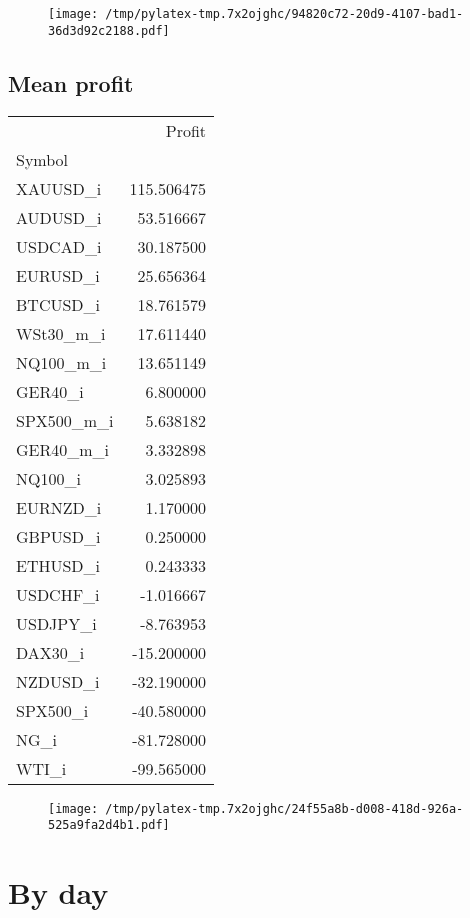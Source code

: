 \documentclass{article}%
\begin{document}
\begin{figure}[htbp]%
\centering%
\texttt{[image: /tmp/pylatex-tmp.7x2ojghc/94820c72-20d9-4107-bad1-36d3d92c2188.pdf]}%
\end{figure}

%
\newpage %
\subsection{Mean profit }%
\label{subsec:Meanprofit}%
\begin{tabular}{lr}
\toprule
{} &      Profit \\
Symbol     &             \\
\midrule
XAUUSD\_i   &  115.506475 \\
AUDUSD\_i   &   53.516667 \\
USDCAD\_i   &   30.187500 \\
EURUSD\_i   &   25.656364 \\
BTCUSD\_i   &   18.761579 \\
WSt30\_m\_i  &   17.611440 \\
NQ100\_m\_i  &   13.651149 \\
GER40\_i    &    6.800000 \\
SPX500\_m\_i &    5.638182 \\
GER40\_m\_i  &    3.332898 \\
NQ100\_i    &    3.025893 \\
EURNZD\_i   &    1.170000 \\
GBPUSD\_i   &    0.250000 \\
ETHUSD\_i   &    0.243333 \\
USDCHF\_i   &   -1.016667 \\
USDJPY\_i   &   -8.763953 \\
DAX30\_i    &  -15.200000 \\
NZDUSD\_i   &  -32.190000 \\
SPX500\_i   &  -40.580000 \\
NG\_i       &  -81.728000 \\
WTI\_i      &  -99.565000 \\
\bottomrule
\end{tabular}
%


\begin{figure}[htbp]%
\centering%
\texttt{[image: /tmp/pylatex-tmp.7x2ojghc/24f55a8b-d008-418d-926a-525a9fa2d4b1.pdf]}%
\end{figure}

%
\newpage %
\section{By day}%
\label{sec:Byday}%
\end{document}
